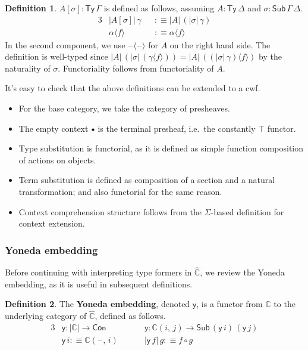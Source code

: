 \documentclass[12pt,a4paper,twoside,openany]{book}
\theoremstyle{remark}
\theoremstyle{definition}
\newtheorem{mydefinition}{Definition}
\theoremstyle{theorem}
\newcommand{\ms}[1]{\mathsf{#1}}
\newcommand{\mbb}[1]{\mathbb{#1}}
\newcommand{\Con}{\mathsf{Con}}
\newcommand{\Sub}{\mathsf{Sub}}
\newcommand{\Ty}{\mathsf{Ty}}
\newcommand{\blank}{\mathord{\hspace{1pt}\text{--}\hspace{1pt}}}
\newcommand{\emptycon}{\scaleobj{.75}\bullet}
\newcommand{\mbbC}{\mbb{C}}
\newcommand{\hmbbC}{\hat{\mbb{C}}}
\newcommand{\lab}{\langle}
\newcommand{\rab}{\rangle}
\newcommand{\defn}{:\equiv}
\newcommand{\yon}{\ms{y}}
\begin{document}
\begin{mydefinition}
$A[\sigma] : \Ty\,\Gamma$ is defined as follows, assuming
$A : \Ty\,\Delta$ and $\sigma : \Sub\,\Gamma\,\Delta$.
\begin{alignat*}{3}
  & |A[\sigma]|\,\gamma &&\defn |A|\,(|\sigma|\,\gamma) \\
  & \alpha \lab f \rab &&\defn \alpha \lab f \rab
\end{alignat*}
In the second component, we use $\blank\!\lab\!\blank\!\rab$ for $A$ on the right hand
side.  The definition is well-typed since $|A|\,(|\sigma|\,(\gamma\lab f \rab))
= |A|\,((|\sigma|\,\gamma)\lab f \rab)$ by the naturality of
$\sigma$. Functoriality follows from functoriality of $A$.
\end{mydefinition}

It's easy to check that the above definitions can be extended to a cwf.
\begin{itemize}
  \item For the base category, we take the category of presheaves.
  \item The empty context $\emptycon$ is the terminal presheaf, i.e.\ the
        constantly $\top$ functor.
  \item Type substitution is functorial, as it is defined as simple function
    composition of actions on objects.
  \item Term substitution is defined as composition of a section and
    a natural transformation; and also functorial for the same reason.
  \item Context comprehension structure follows from the $\Sigma$-based definition for
    context extension.
\end{itemize}

\subsubsection{Yoneda embedding}

Before continuing with interpreting type formers in $\hmbbC$, we review the
Yoneda embedding, as it is useful in subsequent definitions.

\begin{mydefinition}
The \textbf{Yoneda embedding}, denoted $\ms{y}$, is a functor from $\mbbC$ to
the underlying category of $\hmbbC$, defined as follows.
\begin{alignat*}{3}
  & \yon : |\mbbC| \to \Con \hspace{3em}&& \yon : \mbbC(i,\,j) \to \Sub\,(\yon\,i)\,(\yon\,j)\\
  & \yon\,i \defn \mbbC(\blank,\,i) && |\yon\,f|\,g \defn f \circ g
\end{alignat*}
\end{mydefinition}
\end{document}

